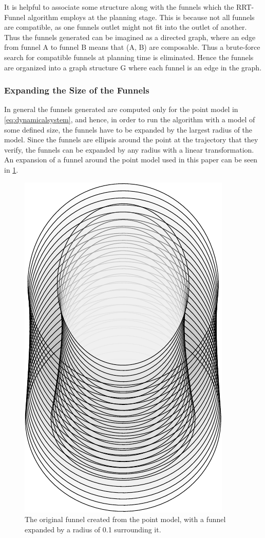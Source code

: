 It is helpful to associate some structure along with the funnels which the RRT-Funnel algorithm
employs at the planning stage. This is because not all funnels
are compatible, as one funnels outlet might not fit into the
outlet of another. Thus the funnels generated can be imagined
as a directed graph, where an edge from funnel A to funnel B
means that (A, B) are composable. Thus a brute-force search
for compatible funnels at planning time is eliminated. Hence
the funnels are organized into a graph structure G where each
funnel is an edge in the graph.

\subsubsection{Expanding the Size of the Funnels}

In general the funnels generated are computed only for the point model in
\cref{eq:dynamicalsystem}, and hence, in order to run the algorithm with a
model of some defined size, the funnels have to be expanded by the largest
radius of the model. Since the funnels are ellipsis around the point at the
trajectory that they verify, the funnels can be expanded by any radius with a
linear transformation. An expansion of a funnel around the point model used in
this paper can be seen in \cref{fig:expanded-funnel}.


\begin{figure}[!t]
  \centering \includegraphics[scale=.3]{figures/method/expanded-funnel}
  \caption[The expanded experiment funnel]{The original funnel created from the point model, with a funnel
    expanded by a radius of 0.1 surrounding it.}
  \label{fig:expanded-funnel}
\end{figure}
